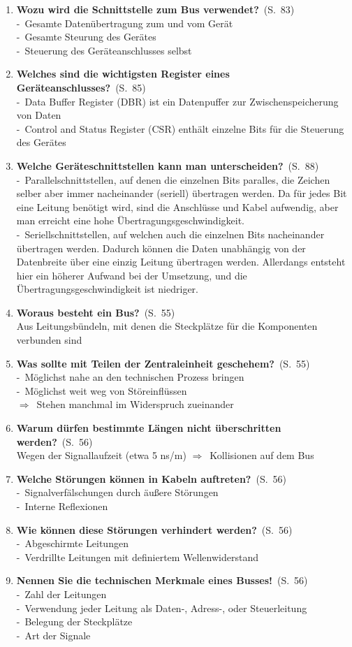 \documentclass[a4paper,12pt]{article}
\newcommand{\question}[3]{\pagebreak[3]\item {\textbf{#1?}}\ (S.\ #2)#3}
\newcommand{\statement}[3]{\pagebreak[3]\item {\textbf{#1!}}\ (S.\ #2)#3}
\newcommand{\catchword}[1]{\\-\ #1}
\newcommand{\normaltext}[1]{\\#1}
\newcommand{\result}[1]{\\ $\Rightarrow$\ #1}
\newcommand{\resultol}[1]{ $\Rightarrow$\ #1}
\newcommand{\page}[1]{#1}
\begin{document}
\begin{enumerate}
  \question{Wozu wird die Schnittstelle zum Bus verwendet}{\page{83}}
  {
    \catchword{Gesamte Datenübertragung zum und vom Gerät}
    \catchword{Gesamte Steurung des Gerätes}
    \catchword{Steuerung des Geräteanschlusses selbst}
  }

  \question{Welches sind die wichtigsten Register eines Geräteanschlusses}{\page{85}}
  {
    \catchword{Data Buffer Register (DBR) ist ein Datenpuffer zur Zwischenspeicherung von Daten}
    \catchword{Control and Status Register (CSR) enthält einzelne Bits für die Steuerung des Gerätes}
  }


  \question{Welche Geräteschnittstellen kann man unterscheiden}{\page{88}}
  {
    \catchword{Parallelschnittstellen, auf denen die einzelnen Bits paralles, die Zeichen selber aber immer
    nacheinander (seriell) übertragen werden. Da für jedes Bit eine Leitung benötigt wird, sind die Anschlüsse
    und Kabel aufwendig, aber man erreicht eine hohe Übertragungsgeschwindigkeit.}
    \catchword{Seriellschnittstellen, auf welchen auch die einzelnen Bits nacheinander übertragen werden. Dadurch
    können die Daten unabhängig von der Datenbreite über eine einzig Leitung übertragen werden. Allerdangs entsteht
    hier ein höherer Aufwand bei der Umsetzung, und die Übertragungsgeschwindigkeit ist niedriger.}
  }


  \question{Woraus besteht ein Bus}{\page{55}}
  {
    \normaltext{Aus Leitungsbündeln, mit denen die Steckplätze für die Komponenten verbunden sind}
  }

  \question{Was sollte mit Teilen der Zentraleinheit geschehem}{\page{55}}
  {
    \catchword{Möglichst nahe an den technischen Prozess bringen}
    \catchword{Möglichst weit weg von Störeinflüssen}
    \result{Stehen manchmal im Widerspruch zueinander}
  }

  \question{Warum dürfen bestimmte Längen nicht überschritten werden}{\page{56}}
  {
    \normaltext{Wegen der Signallaufzeit (etwa 5 ns/m)\resultol{Kollisionen auf dem Bus}}
  }

  \question{Welche Störungen können in Kabeln auftreten}{\page{56}}
  {
    \catchword{Signalverfälschungen durch äußere Störungen}
    \catchword{Interne Reflexionen}
  }

  \question{Wie können diese Störungen verhindert werden}{\page{56}}
  {
    \catchword{Abgeschirmte Leitungen}
    \catchword{Verdrillte Leitungen mit definiertem Wellenwiderstand}
  }

  \statement{Nennen Sie die technischen Merkmale eines Busses}{\page{56}}
  {
    \catchword{Zahl der Leitungen}
    \catchword{Verwendung jeder Leitung als Daten-, Adress-, oder Steuerleitung}
    \catchword{Belegung der Steckplätze}
    \catchword{Art der Signale}
  }


\end{enumerate}
\end{document}
